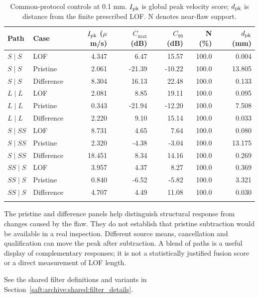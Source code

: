 \documentclass[11pt]{article}
\begin{document}
\begin{table}[htbp]\centering\small
\caption{Common-protocol controls at 0.1 mm. $I_{\rm pk}$ is global peak velocity score; $d_{\rm pk}$ is distance from the finite prescribed LOF. N denotes near-flaw support.}
\label{saft:archive:full:controls}
\begin{tabular}{@{}llrrrrr@{}}\toprule
Path & Case & $I_{\rm pk}$ ($\mu$m/s) & $C_{\max}$ (dB) & $C_{99}$ (dB) & N (\%) & $d_{\rm pk}$ (mm)\\\midrule
$S\mid S$ & LOF & 4.347 & 6.47 & 15.57 & 100.0 & 0.004 \\
$S\mid S$ & Pristine & 2.061 & -21.39 & -10.22 & 100.0 & 13.805 \\
$S\mid S$ & Difference & 8.304 & 16.13 & 22.48 & 100.0 & 0.133 \\
\addlinespace
$L\mid L$ & LOF & 2.081 & 8.85 & 19.11 & 100.0 & 0.095 \\
$L\mid L$ & Pristine & 0.343 & -21.94 & -12.20 & 100.0 & 7.508 \\
$L\mid L$ & Difference & 2.220 & 9.10 & 15.14 & 100.0 & 0.033 \\
\addlinespace
$S\mid SS$ & LOF & 8.731 & 4.65 & 7.64 & 100.0 & 0.080 \\
$S\mid SS$ & Pristine & 2.320 & -4.38 & -3.04 & 100.0 & 13.175 \\
$S\mid SS$ & Difference & 18.451 & 8.34 & 14.16 & 100.0 & 0.269 \\
\addlinespace
$SS\mid S$ & LOF & 3.957 & 4.37 & 8.27 & 100.0 & 0.369 \\
$SS\mid S$ & Pristine & 0.840 & -6.52 & -5.82 & 100.0 & 3.321 \\
$SS\mid S$ & Difference & 4.707 & 4.49 & 11.08 & 100.0 & 0.030 \\
\addlinespace

\bottomrule\end{tabular}
\end{table}

The pristine and difference panels help distinguish structural response from changes caused by the flaw. They do not establish that pristine subtraction would be available in a real inspection. Different source means, cancellation and qualification can move the peak after subtraction. A blend of paths is a useful display of complementary responses; it is not a statistically justified fusion score or a direct measurement of LOF length.

See the shared filter definitions and variants in Section~\ref{saft:archive:shared:filter_details}.
\end{document}
